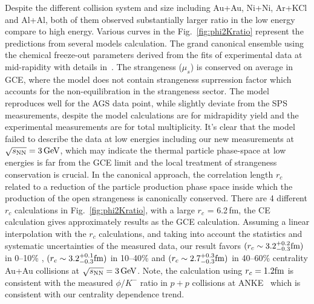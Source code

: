 \documentclass[%
 reprint,	
showpacs,
 amsmath,amssymb,
 aps,
 prc,
]{revtex4-1}
\begin{document}
Despite the different collision system and size including Au+Au, Ni+Ni, Ar+KCl and Al+Al, both of them observed substantially larger ratio in the low energy compare to high energy. Various curves in the Fig.~\ref{fig:phi2Kratio} represent the predictions from several models calculation. The grand canonical ensemble using the chemical freeze-out parameters derived from the fits of experimental data at mid-rapidity with details in~\cite{ANDRONIC2006167}. The strangeness ($\mu_s$) is conserved on average in GCE, where the model does not contain strangeness suprression factor which accounts for the non-equilibration in the strangeness sector. The model reproduces well for the AGS data point, while slightly deviate from the SPS measurements, despite the model calculations are for midrapidity yield and the experimental measurements are for total multiplicity. It's clear that the model failed to describe the data at low energies including our new measurements at ${\sqrt{s_{\rm NN}} = \rm{3\,GeV}}$, which may indicate the thermal particle phase-space at low energies is far from the GCE limit and the local treatment of strangeness conservation is crucial. In the canonical approach, the correlation length $r_c$ related to a reduction of the particle production phase space inside which the production of the open strangeness is canonically conserved. There are 4 different $r_c$ calculations in Fig.~\ref{fig:phi2Kratio}, with a large $r_c$ = 6.2\,fm, the CE calculation gives approximately results as the GCE calculation. Assuming a linear interpolation with the $r_c$ calculations, and taking into account the statistics and systematic uncertainties of the measured data, our result favors $(r_c  \sim 3.2_{-0.3}^{+0.2} \rm{fm})$ in 0--10\% , $(r_c  \sim 3.2_{-0.3}^{+0.1} \rm{fm})$ in 10--40\% and $(r_c  \sim 2.7_{-0.3}^{+0.3} \rm{fm})$ in 40--60\% centrality Au+Au collisions at ${\sqrt{s_{\rm NN}} = \rm{3\,GeV}}$. Note, the calculation using $r_c = 1.2 \rm{fm}$ is consistent with the measured $\phi/K^-$ ratio in $p+p$ collisions at ANKE~\cite{PhysRevC.80.025209} which is consistent with our centrality dependence trend.
\end{document}
